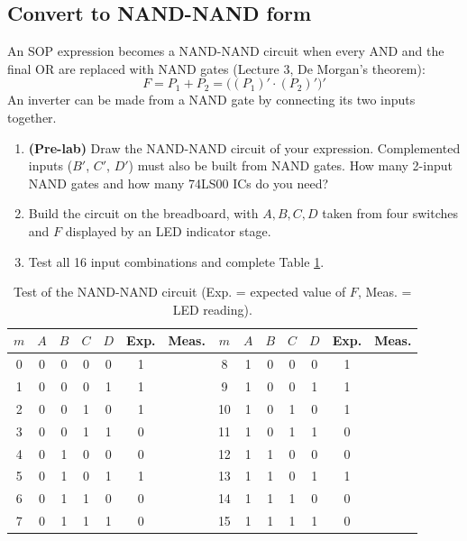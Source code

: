 \documentclass{article}
\begin{document}
\subsection*{Convert to NAND-NAND form}
An SOP expression becomes a NAND-NAND circuit when every AND and the final OR are replaced with NAND gates (Lecture 3, De Morgan's theorem):
\[ F = P_1 + P_2 = \big( (P_1)' \cdot (P_2)' \big)' \]
An inverter can be made from a NAND gate by connecting its two inputs together.

\begin{enumerate}
    \item[(d)] \textbf{(Pre-lab)} Draw the NAND-NAND circuit of your expression. Complemented inputs ($B'$, $C'$, $D'$) must also be built from NAND gates. How many 2-input NAND gates and how many 74LS00 ICs do you need? \underline{\hspace{4cm}}
    \item[(e)] Build the circuit on the breadboard, with $A, B, C, D$ taken from four switches and $F$ displayed by an LED indicator stage.
    \item[(f)] Test all 16 input combinations and complete Table \ref{tab:kmap_test}.
\end{enumerate}

\begin{table}[H]
    \centering
    \small
    \setlength{\tabcolsep}{4pt}
    \begin{tabular}{|c|cccc|c|c||c|cccc|c|c|}
        \hline
        $m$ & $A$ & $B$ & $C$ & $D$ & Exp. & Meas. & $m$ & $A$ & $B$ & $C$ & $D$ & Exp. & Meas. \\
        \hline
        0 & 0&0&0&0 & 1 & & 8 & 1&0&0&0 & 1 & \\
        1 & 0&0&0&1 & 1 & & 9 & 1&0&0&1 & 1 & \\
        2 & 0&0&1&0 & 1 & & 10 & 1&0&1&0 & 1 & \\
        3 & 0&0&1&1 & 0 & & 11 & 1&0&1&1 & 0 & \\
        4 & 0&1&0&0 & 0 & & 12 & 1&1&0&0 & 0 & \\
        5 & 0&1&0&1 & 1 & & 13 & 1&1&0&1 & 1 & \\
        6 & 0&1&1&0 & 0 & & 14 & 1&1&1&0 & 0 & \\
        7 & 0&1&1&1 & 0 & & 15 & 1&1&1&1 & 0 & \\
        \hline
    \end{tabular}
    \caption{Test of the NAND-NAND circuit (Exp. = expected value of $F$, Meas. = LED reading).}
    \label{tab:kmap_test}
\end{table}
\end{document}
